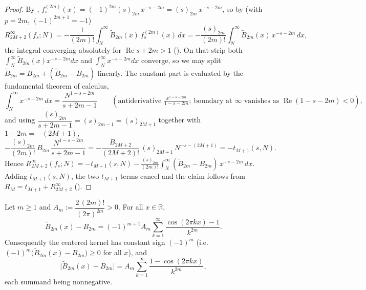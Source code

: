 \begin{proof}
\leanok
{}
By , $f_s^{(2m)}(x) = (-1)^{2m}(s)_{2m}\,x^{-s-2m}
= (s)_{2m}\,x^{-s-2m}$, so by  (with $p = 2m$, $(-1)^{2m+1} = -1$)
\[
  R^{\infty}_{2M+2}(f_s; N) = -\frac{1}{(2m)!}\int_N^{\infty}\widetilde{B}_{2m}(x)\,f_s^{(2m)}(x)\,dx
  = -\frac{(s)_{2m}}{(2m)!}\int_N^{\infty}\widetilde{B}_{2m}(x)\,x^{-s-2m}\,dx,
\]
the integral converging absolutely for $\operatorname{Re} s + 2m > 1$
(). On that strip both $\int_N^{\infty}\widetilde{B}_{2m}(x)x^{-s-2m}dx$
and $\int_N^{\infty} x^{-s-2m}dx$ converge, so we may split
$\widetilde{B}_{2m} = B_{2m} + (\widetilde{B}_{2m} - B_{2m})$ linearly. The constant part is
evaluated by the fundamental theorem of calculus,
\[
  \int_N^{\infty} x^{-s-2m}\,dx = \frac{N^{1-s-2m}}{s+2m-1}
  \qquad(\text{antiderivative } \tfrac{x^{1-s-2m}}{1-s-2m};\ \text{boundary at } \infty
  \text{ vanishes as } \operatorname{Re}(1-s-2m) < 0),
\]
and using $\dfrac{(s)_{2m}}{s+2m-1} = (s)_{2m-1} = (s)_{2M+1}$ together with $1-2m = -(2M+1)$,
\[
  -\frac{(s)_{2m}}{(2m)!}\,B_{2m}\,\frac{N^{1-s-2m}}{s+2m-1}
  = -\frac{B_{2M+2}}{(2M+2)!}\,(s)_{2M+1}\,N^{-s-(2M+1)} = -t_{M+1}(s,N).
\]
Hence $R^{\infty}_{2M+2}(f_s;N) = -t_{M+1}(s,N) - \frac{(s)_{2m}}{(2m)!}
\int_N^{\infty}(\widetilde{B}_{2m}-B_{2m})\,x^{-s-2m}\,dx$. Adding $t_{M+1}(s,N)$, the two
$t_{M+1}$ terms cancel and the claim follows from $R_M = t_{M+1} + R^{\infty}_{2M+2}$
().
\end{proof}

\begin{lemma}
\label{lem:bernoulli_centered_fourier}
\leanok
{}
Let $m \ge 1$ and $A_m := \dfrac{2\,(2m)!}{(2\pi)^{2m}} > 0$. For all $x \in \mathbb{R}$,
\[
  \widetilde{B}_{2m}(x) - B_{2m}
    = (-1)^{m+1} A_m \sum_{k=1}^{\infty}\frac{\cos(2\pi k x) - 1}{k^{2m}} .
\]
Consequently the centered kernel has constant sign $(-1)^m$ (i.e.
$(-1)^m\bigl(\widetilde{B}_{2m}(x) - B_{2m}\bigr) \ge 0$ for all $x$), and
\[
  \bigl|\widetilde{B}_{2m}(x) - B_{2m}\bigr|
    = A_m \sum_{k=1}^{\infty}\frac{1 - \cos(2\pi k x)}{k^{2m}} ,
\]
each summand being nonnegative.
\end{lemma}

